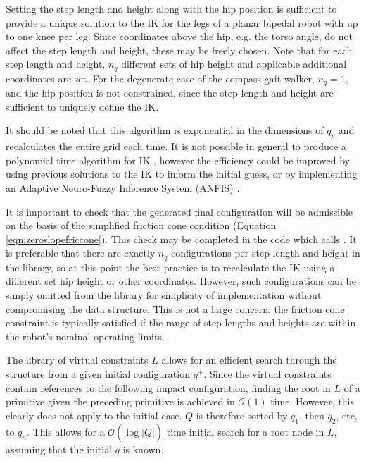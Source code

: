 Setting the step length and height along with the hip position is sufficient to provide a unique solution to the IK for the legs of a planar bipedal robot with up to one knee per leg. Since coordinates above the hip, e.g. the torso angle, do not affect the step length and height, these may be freely chosen. Note that for each step length and height, $n_q$ different sets of hip height and applicable additional coordinates are set. For the degenerate case of the compass-gait walker, $n_q=1$, and the hip position is not constrained, since the step length and height are sufficient to uniquely define the IK.

It should be noted that this algorithm is exponential in the dimensions of $q_p$ and recalculates the entire grid each time. It is not possible in general to produce a polynomial time algorithm for IK \cite{??}, however the efficiency could be improved by using previous solutions to the IK to inform the initial guess, or by implementing an Adaptive Neuro-Fuzzy Inference System (ANFIS) \cite{??}.

It is important to check that the generated final configuration will be admissible on the basis of the simplified friction cone condition (Equation \ref{eqn:zeroslopefriccone}). This check may be completed in the code which calls . It is preferable that there are exactly $n_q$ configurations per step length and height in the library, so at this point the best practice is to recalculate the IK using a different set hip height or other coordinates. However, such configurations can be simply omitted from the library for simplicity of implementation without compromising the data structure. This is not a large concern; the friction cone constraint is typically satisfied if the range of step lengths and heights are within the robot's nominal operating limits.

The library of virtual constraints $L$ allows for an efficient search through the structure from a given initial configuration $q^+$. Since the virtual constraints contain references to the following impact configuration, finding the root in $L$ of a primitive given the preceding primitive is achieved in $\mathcal{O}(1)$ time. However, this clearly does not apply to the initial case. $\tilde{Q}$ is therefore sorted by $q_1$, then $q_2$, etc, to $q_n$. This allows for a $\mathcal{O}(\log\lvert\tilde{Q}\rvert)$ time initial search for a root node in $L$, assuming that the initial $q$ is known.

